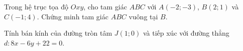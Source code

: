 \begin{bt}%
    [1,0 điểm]
    Trong hệ trục tọa độ $Oxy$, cho tam giác $ABC$ với $A(-2;-3)$, $B(2;1)$ và $C(-1;4)$. Chứng minh tam giác $ABC$ vuông tại $B$.
\end{bt}

\begin{bt}%
	Tính bán kính của đường tròn tâm $J(1;0)$ và tiếp xúc với đường thẳng $d\colon 8x-6y+22=0$.
\end{bt}

